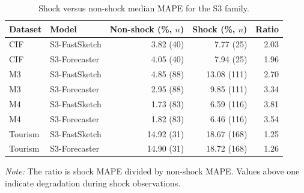 \begin{table}[t]
\centering
\caption{Shock versus non-shock median MAPE for the S3 family.}
\label{tab:shock_phase1}
\footnotesize
\setlength{\tabcolsep}{4pt}
\begin{tabular}{llrrr}
\toprule
Dataset & Model & Non-shock (\%, $n$) & Shock (\%, $n$) & Ratio \\
\midrule
CIF & S3-FastSketch & 3.82 (40) & 7.77 (25) & 2.03 \\
CIF & S3-Forecaster & 4.05 (40) & 7.94 (25) & 1.96 \\
M3 & S3-FastSketch & 4.85 (88) & 13.08 (111) & 2.70 \\
M3 & S3-Forecaster & 2.95 (88) & 9.85 (111) & 3.34 \\
M4 & S3-FastSketch & 1.73 (83) & 6.59 (116) & 3.81 \\
M4 & S3-Forecaster & 1.82 (83) & 6.46 (116) & 3.54 \\
Tourism & S3-FastSketch & 14.92 (31) & 18.67 (168) & 1.25 \\
Tourism & S3-Forecaster & 14.90 (31) & 18.72 (168) & 1.26 \\
\bottomrule
\end{tabular}
\begin{minipage}{0.96\linewidth}
\footnotesize\emph{Note:} The ratio is shock MAPE divided by non-shock MAPE. Values above one indicate degradation during shock observations.
\end{minipage}
\end{table}
